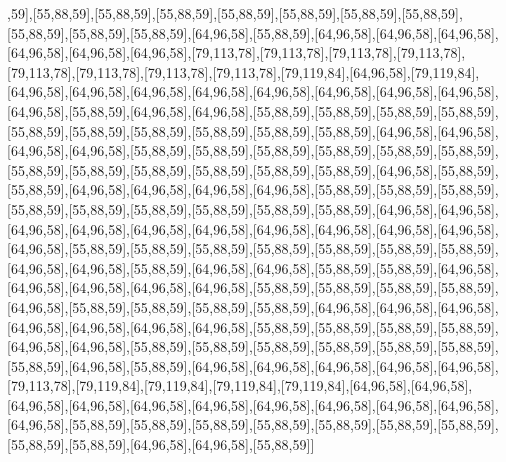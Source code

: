 ,59],[55,88,59],[55,88,59],[55,88,59],[55,88,59],[55,88,59],[55,88,59],[55,88,59],[55,88,59],[55,88,59],[55,88,59],[64,96,58],[55,88,59],[64,96,58],[64,96,58],[64,96,58],[64,96,58],[64,96,58],[64,96,58],[79,113,78],[79,113,78],[79,113,78],[79,113,78],[79,113,78],[79,113,78],[79,113,78],[79,113,78],[79,119,84],[64,96,58],[79,119,84],[64,96,58],[64,96,58],[64,96,58],[64,96,58],[64,96,58],[64,96,58],[64,96,58],[64,96,58],[64,96,58],[55,88,59],[64,96,58],[64,96,58],[55,88,59],[55,88,59],[55,88,59],[55,88,59],[55,88,59],[55,88,59],[55,88,59],[55,88,59],[55,88,59],[55,88,59],[64,96,58],[64,96,58],[64,96,58],[64,96,58],[55,88,59],[55,88,59],[55,88,59],[55,88,59],[55,88,59],[55,88,59],[55,88,59],[55,88,59],[55,88,59],[55,88,59],[55,88,59],[55,88,59],[64,96,58],[55,88,59],[55,88,59],[64,96,58],[64,96,58],[64,96,58],[64,96,58],[55,88,59],[55,88,59],[55,88,59],[55,88,59],[55,88,59],[55,88,59],[55,88,59],[55,88,59],[55,88,59],[64,96,58],[64,96,58],[64,96,58],[64,96,58],[64,96,58],[64,96,58],[64,96,58],[64,96,58],[64,96,58],[64,96,58],[64,96,58],[55,88,59],[55,88,59],[55,88,59],[55,88,59],[55,88,59],[55,88,59],[55,88,59],[64,96,58],[64,96,58],[55,88,59],[64,96,58],[64,96,58],[55,88,59],[55,88,59],[64,96,58],[64,96,58],[64,96,58],[64,96,58],[64,96,58],[55,88,59],[55,88,59],[55,88,59],[55,88,59],[64,96,58],[55,88,59],[55,88,59],[55,88,59],[55,88,59],[64,96,58],[64,96,58],[64,96,58],[64,96,58],[64,96,58],[64,96,58],[64,96,58],[55,88,59],[55,88,59],[55,88,59],[55,88,59],[64,96,58],[64,96,58],[55,88,59],[55,88,59],[55,88,59],[55,88,59],[55,88,59],[55,88,59],[55,88,59],[64,96,58],[55,88,59],[64,96,58],[64,96,58],[64,96,58],[64,96,58],[64,96,58],[79,113,78],[79,119,84],[79,119,84],[79,119,84],[79,119,84],[64,96,58],[64,96,58],[64,96,58],[64,96,58],[64,96,58],[64,96,58],[64,96,58],[64,96,58],[64,96,58],[64,96,58],[64,96,58],[55,88,59],[55,88,59],[55,88,59],[55,88,59],[55,88,59],[55,88,59],[55,88,59],[55,88,59],[55,88,59],[64,96,58],[64,96,58],[55,88,59]]


